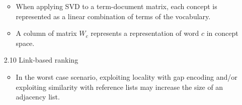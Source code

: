 \begin{enumerate}
    \begin{itemize}
      \item  When applying SVD to a term-document matrix, each concept is represented as a linear combination of terms of the vocabulary.
      \item A column of matrix $W_c$ represents a representation of word $c$ in concept space.
    \end{itemize}
    \item[2.10] Link-based ranking
    \begin{itemize}
      \item In the worst case scenario, exploiting locality with gap encoding and/or exploiting similarity with reference lists may increase the size of an adjacency list.
    \end{itemize}
  \end{enumerate}